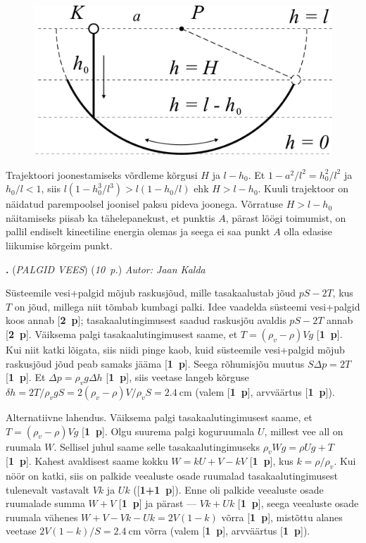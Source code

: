 \documentclass[11pt,a5paper]{article}
\newcommand{\numb}[1]{\vspace{5pt}\textbf{\large #1}}
\newcommand{\nimi}[1]{(\textsl{\small #1})}
\newcommand{\punktid}[1]{(\emph{#1~p.})}
\newcommand{\p}[1]{[\textbf{#1~p}]}
\newcounter{ylesanne}
\newcommand{\yl}[1]{\addtocounter{ylesanne}{1}\numb{\theylesanne.} \nimi{#1} \newblock{}}
\newcommand{\autor}[1]{\emph{Autor: #1}}%
\begin{document}
\begin{figure}
\vspace{-1cm}
  \begin{center}
    \includegraphics[width=1\linewidth]{mn_sol_2.pdf}
  \end{center}
  \vspace{-1.0cm}
\end{figure}

Trajektoori joonestamiseks võrdleme kõrgusi $H$ ja $l-h_0$. Et $1-a^2/l^2=h_0^2/l^2$ ja $h_0/l<1$, siis
$l(1-h_0^3/l^3)>l(1-h_0/l)$
ehk $H>l-h_0$.
Kuuli trajektoor on näidatud parempoolsel joonisel paksu pideva joonega. Võrratuse $H>l-h_0$ näitamiseks piisab ka tähelepanekust, et punktis $A$, pärast löögi toimumist, on pallil endiselt kineetiline energia olemas ja seega ei saa punkt $A$ olla edasise liikumise kõrgeim punkt.


\yl{PALGID VEES}
\punktid{10} \autor{Jaan Kalda}

Süsteemile vesi+palgid mõjub raskusjõud, mille tasakaalustab jõud $pS-2T$, kus $T$ on jõud, millega niit tõmbab kumbagi palki. Idee vaadelda süsteemi vesi+palgid koos annab \p{2}; tasakaalutingimusest saadud raskusjõu avaldis $pS-2T$ annab \p{2}. Väiksema palgi tasakaalutingimusest saame, et $T=(\rho_v- \rho)Vg$ \p{1}. Kui niit katki lõigata, siis niidi pinge kaob, kuid süsteemile vesi+palgid mõjub raskusjõud jõud peab samaks jääma \p{1}. Seega rõhumisjõu muutus $S\Delta p=2T$ \p{1}. Et $\Delta p=\rho_vg\Delta h$ \p{1}, siis veetase langeb kõrguse $\delta h=2T/\rho_vgS=2(\rho_v- \rho)V/\rho_vS=\SI{2.4}{\cm}$ (valem \p{1}, arvväärtus \p{1}).

Alternatiivne lahendus.  Väiksema palgi tasakaalutingimusest saame, et $T=(\rho_v- \rho)Vg$ \p{1}. Olgu suurema palgi koguruumala $U$, millest vee all on ruumala $W$. Sellisel juhul saame selle tasakaalutingimuseks $\rho_v Wg= \rho Ug+T$ \p{1}. Kahest avaldisest saame kokku $W=kU+V-kV$ \p{1}, kus $k=\rho/\rho_v$. Kui nöör on katki, siis on palkide veealuste osade ruumalad tasakaalutingimusest tulenevalt vastavalt $Vk$ ja $Uk$ (\p{1+1}). Enne oli palkide veealuste osade ruumalade summa $W+V$ \p{1} ja pärast --- $Vk+Uk$ \p{1}, seega veealuste osade ruumala vähenes $W+V-Vk-Uk=2V(1-k)$ võrra \p{1}, mistõttu alanes veetase $2V(1-k)/S=\SI{2.4}{\cm}$ võrra (valem \p{1}, arvväärtus \p{1}).
\end{document}
